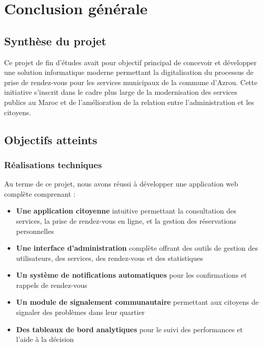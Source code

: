 \chapter*{Conclusion générale}

\section*{Synthèse du projet}

Ce projet de fin d'études avait pour objectif principal de concevoir et développer une solution informatique moderne permettant la digitalisation du processus de prise de rendez-vous pour les services municipaux de la commune d'Azrou. Cette initiative s'inscrit dans le cadre plus large de la modernisation des services publics au Maroc et de l'amélioration de la relation entre l'administration et les citoyens.

\section*{Objectifs atteints}

\subsection*{Réalisations techniques}

Au terme de ce projet, nous avons réussi à développer une application web complète comprenant :

\begin{itemize}
    \item \textbf{Une application citoyenne} intuitive permettant la consultation des services, la prise de rendez-vous en ligne, et la gestion des réservations personnelles
    \item \textbf{Une interface d'administration} complète offrant des outils de gestion des utilisateurs, des services, des rendez-vous et des statistiques
    \item \textbf{Un système de notifications automatiques} pour les confirmations et rappels de rendez-vous
    \item \textbf{Un module de signalement communautaire} permettant aux citoyens de signaler des problèmes dans leur quartier
    \item \textbf{Des tableaux de bord analytiques} pour le suivi des performances et l'aide à la décision
\end{itemize}

